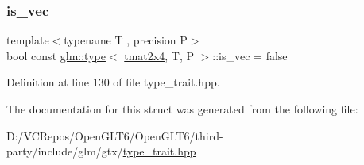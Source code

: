 \subsubsection{\texorpdfstring{is\_vec}{is\_vec}}
{\footnotesize\ttfamily template$<$typename T , precision P$>$ \\
bool const \mbox{\hyperlink{structglm_1_1type}{glm\+::type}}$<$ \mbox{\hyperlink{structglm_1_1tmat2x4}{tmat2x4}}, T, P $>$\+::is\+\_\+vec = false\hspace{0.3cm}{\ttfamily [static]}}



Definition at line 130 of file type\+\_\+trait.\+hpp.



The documentation for this struct was generated from the following file\+:\begin{DoxyCompactItemize}
\item 
D\+:/\+V\+C\+Repos/\+Open\+G\+L\+T6/\+Open\+G\+L\+T6/third-\/party/include/glm/gtx/\mbox{\hyperlink{type__trait_8hpp}{type\+\_\+trait.\+hpp}}\end{DoxyCompactItemize}
